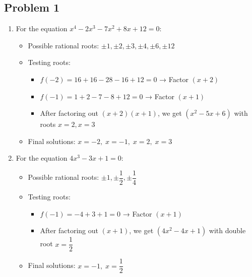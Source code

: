 \documentclass[12pt]{article}
\begin{document}
\subsection*{Problem 1}
\begin{enumerate}[label=(\alph*)]
    \item For the equation \(x^4 - 2x^3 - 7x^2 + 8x + 12 = 0\):
    \begin{itemize}
        \item Possible rational roots: \(\pm1, \pm2, \pm3, \pm4, \pm6, \pm12\)
        \item Testing roots:
        \begin{itemize}
            \item \(f(-2) = 16 + 16 - 28 - 16 + 12 = 0\) → Factor \((x+2)\)
            \item \(f(-1) = 1 + 2 - 7 - 8 + 12 = 0\) → Factor \((x+1)\)
            \item After factoring out \((x+2)(x+1)\), we get \((x^2 - 5x + 6)\) with roots \(x=2, x=3\)
        \end{itemize}
        \item Final solutions: \(\boxed{x = -2,\; x = -1,\; x = 2,\; x = 3}\)
    \end{itemize}
    
    \item For the equation \(4x^3 - 3x + 1 = 0\):
    \begin{itemize}
        \item Possible rational roots: \(\pm1, \pm\dfrac{1}{2}, \pm\dfrac{1}{4}\)
        \item Testing roots:
        \begin{itemize}
            \item \(f(-1) = -4 + 3 + 1 = 0\) → Factor \((x+1)\)
            \item After factoring out \((x+1)\), we get \((4x^2 - 4x + 1)\) with double root \(x=\dfrac{1}{2}\)
        \end{itemize}
        \item Final solutions: \(\boxed{x = -1,\; x = \dfrac{1}{2}}\)
    \end{itemize}
\end{enumerate}
\end{document}
